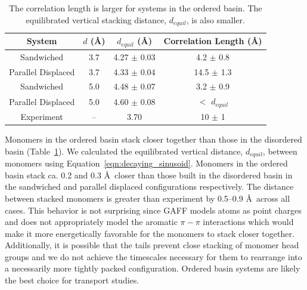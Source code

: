 \documentclass[journal=jpcbfk,manuscript=article]{achemso}
\begin{document}
  \begin{table}[h]
  \centering
  \begin{tabular}{cccc}
  \toprule
  System             & $\mathit{d}$ (\AA) & $\mathit{d}_{equil}$ (\AA) & Correlation Length (\AA) \\
  \midrule
  Sandwiched         & 3.7                &    4.27 $\pm$ 0.03         & 4.2 $\pm$ 0.8            \\
  Parallel Displaced & 3.7                &    4.33 $\pm$ 0.04         & 14.5 $\pm$ 1.3           \\ 
  Sandwiched         & 5.0                &    4.48 $\pm$ 0.07         & 3.2 $\pm$ 0.9            \\
  Parallel Displaced & 5.0                &    4.60 $\pm$ 0.08         & $<$ $d_{equil}$ \\ 
  Experiment         & --                 &    3.70                    & 10 $\pm$ 1               \\
  \bottomrule
  \end{tabular}
  \caption{The correlation length is larger for systems in the ordered basin. The equilibrated vertical
  stacking distance, $\mathit{d}_{equil}$, is also smaller.}
  \label{table:correlation_length}
  \end{table}

  Monomers in the ordered basin stack closer together than those in the disordered basin
  (Table~\ref{table:correlation_length}). We calculated the equilibrated vertical distance,
  $\mathit{d}_{equil}$, between monomers using Equation~\ref{eqn:decaying_sinusoid}. 
  Monomers in the ordered basin stack ca. 0.2 and 0.3 \AA~closer than those built in the 
  disordered basin in the sandwiched and parallel displaced configurations respectively. 
  The distance between stacked monomers is greater than experiment by 0.5--0.9 \AA~across all 
  cases. This behavior is not surprising since GAFF models atoms as point charges and does not 
  appropriately model the aromatic $\pi-\pi$ interactions which would make it more energetically
  favorable for the monomers to stack closer together. Additionally, it is possible that the 
  tails prevent close stacking of monomer head groups and we do not achieve the timescales 
  necessary for them to rearrange into a necessarily more tightly packed configuration. Ordered
  basin systems are likely the best choice for transport studies. 
  
  
\end{document}
